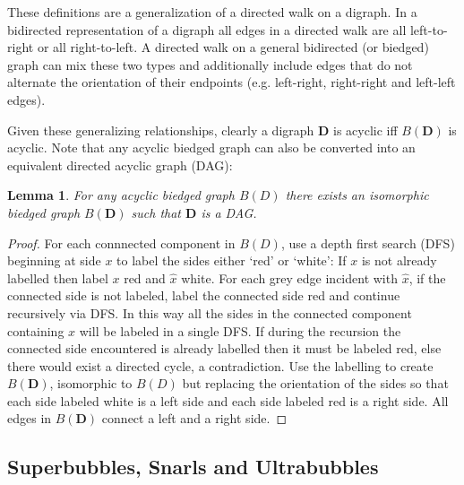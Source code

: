 \documentclass[11pt]{ucthesis}
\newtheorem{lemma}{Lemma}
\newtheorem*{proof}{Proof}
\begin{document}
These definitions are a generalization of a directed walk on a digraph. In a bidirected representation of a digraph all edges in a directed walk are all left-to-right or all right-to-left. A directed walk on a general bidirected (or biedged) graph can mix these two types and additionally include edges that do not alternate the orientation of their endpoints (e.g. left-right, right-right and left-left edges). 

Given these generalizing relationships, clearly a digraph $\textbf{D}$ is acyclic iff $B(\textbf{D})$ is acyclic. Note that any acyclic biedged graph can also be converted into an equivalent directed acyclic graph (DAG):

\begin{lemma}
For any acyclic biedged graph $B(D)$ there exists an isomorphic biedged graph $B(\textbf{D})$ such that $\textbf{D}$ is a DAG.
\label{lemma_acyclic_biedged_graph_is_dag}
\end{lemma}
\begin{proof}
For each connnected component in $B(D)$, use a depth first search (DFS) beginning at side $x$ to label the sides either `red' or `white':  If $x$ is not already labelled then label $x$ red and $\hat{x}$ white. For each grey edge incident with $\hat{x}$, if the connected side is not labeled, label the connected side red and continue recursively via DFS. In this way all the sides in the connected component containing $x$ will be labeled in a single DFS. If during the recursion the connected side encountered is already labelled then it must be labeled red, else there would exist a directed cycle, a contradiction. Use the labelling to create $B(\textbf{D})$, isomorphic to $B(D)$  but replacing the orientation of the sides so that each side labeled white is a left side and each side labeled red is a right side. All edges in $B(\textbf{D})$ connect a left and a right side.
\end{proof}

\subsection{Superbubbles, Snarls and Ultrabubbles}

\end{document}
